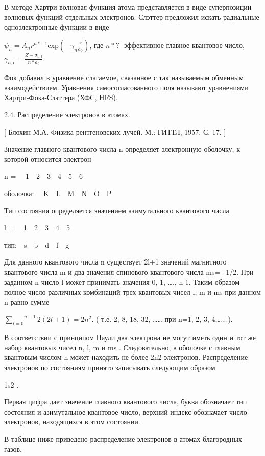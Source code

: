 \documentclass[a4paper,14pt, openany, twoside, draft]{extbook} %
\begin{document}
В методе Хартри волновая функция атома представляется в виде суперпозиции волновых функций отдельных электронов. Слэттер предложил искать радиальные одноэлектронные функции в виде

 $\psi _n=A_nr^{n\ast -1}\text{exp}(-\gamma _n\frac r{a_0})$, где  $n\ast ?${}- эффективное главное квантовое число,  $\gamma _{n,l}=\frac{Z-\sigma _{n,l}}{n\ast a_0}$.

Фок добавил в уравнение слагаемое, связанное с так называемым обменным взаимодействием. Уравнения самосогласованного поля называют уравнениями Хартри-Фока-Слэттера (ХФС, HFS).

2.4. Распределение электронов в атомах.

[ Блохин М.А. Физика рентгеновских лучей. М.: ГИТТЛ, 1957. С. 17. ]

Значение главного квантового числа n определяет электронную оболочку, к которой относится электрон

n = \ \ 1\ \ 2\ \ 3\ \ 4\ \ 5\ \ 6

оболочка: \ \ K\ \ L\ \ M\ \ N\ \ O\ \ P

Тип состояния определяется значением азимутального квантового числа

l = \ \ 1\ \ 2\ \ 3\ \ 4\ \ 5

тип:\ \ s\ \ p\ \ d\ \ f\ \ g\ \

Для данного квантового числа n  существует 2l+1 значений магнитного квантового числа m и два значения спинового квантового числа ms=${\pm}$1/2. При заданном n число l может принимать значения 0, 1, …., n{}-1. Таким образом полное число различных комбинаций трех квантовых чисел l, m и ms при данном n равно сумме

 $\overset{n-1}{\underset{l=0}{\sum }}2(2l+1)=2n^2$.  ( т.е. 2, 8, 18, 32, …… при n=1, 2, 3, 4,…...).

В соответствии с принципом Паули два электрона не могут иметь один и тот же набор квантовых чисел  n, l, m и ms . Следовательно, в оболочке с главным квантовым числом n может находить не более 2n2 электронов. Распределение электронов по состояниям принято записывать следующим образом

1s2 .

Первая цифра дает значение главного квантового числа, буква обозначает тип состояния и азимутальное квантовое число, верхний индекс обозначает число электронов, находящихся в этом состоянии.

В таблице ниже приведено распределение электронов в атомах благородных газов.
\end{document}

